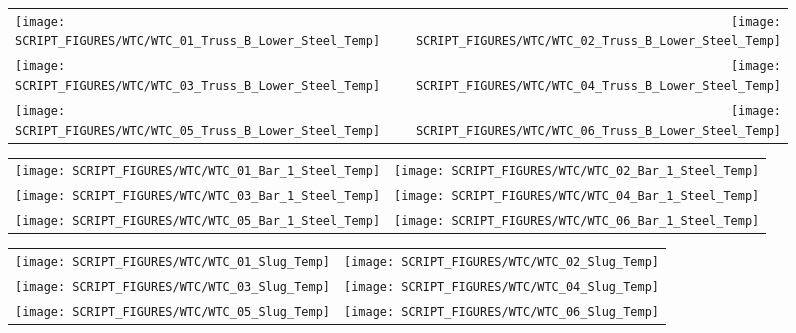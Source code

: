 \begin{figure}[p]
\begin{tabular*}{\textwidth}{l@{\extracolsep{\fill}}r}
\texttt{[image: SCRIPT\_FIGURES/WTC/WTC\_01\_Truss\_B\_Lower\_Steel\_Temp]} &
\texttt{[image: SCRIPT\_FIGURES/WTC/WTC\_02\_Truss\_B\_Lower\_Steel\_Temp]} \\
\texttt{[image: SCRIPT\_FIGURES/WTC/WTC\_03\_Truss\_B\_Lower\_Steel\_Temp]} &
\texttt{[image: SCRIPT\_FIGURES/WTC/WTC\_04\_Truss\_B\_Lower\_Steel\_Temp]} \\
\texttt{[image: SCRIPT\_FIGURES/WTC/WTC\_05\_Truss\_B\_Lower\_Steel\_Temp]} &
\texttt{[image: SCRIPT\_FIGURES/WTC/WTC\_06\_Truss\_B\_Lower\_Steel\_Temp]}
\end{tabular*}
\label{NIST_WTC_Truss_B_Lower_Steel_Temp}
\end{figure}


\begin{figure}[p]
\begin{tabular*}{\textwidth}{l@{\extracolsep{\fill}}r}
\texttt{[image: SCRIPT\_FIGURES/WTC/WTC\_01\_Bar\_1\_Steel\_Temp]} &
\texttt{[image: SCRIPT\_FIGURES/WTC/WTC\_02\_Bar\_1\_Steel\_Temp]} \\
\texttt{[image: SCRIPT\_FIGURES/WTC/WTC\_03\_Bar\_1\_Steel\_Temp]} &
\texttt{[image: SCRIPT\_FIGURES/WTC/WTC\_04\_Bar\_1\_Steel\_Temp]} \\
\texttt{[image: SCRIPT\_FIGURES/WTC/WTC\_05\_Bar\_1\_Steel\_Temp]} &
\texttt{[image: SCRIPT\_FIGURES/WTC/WTC\_06\_Bar\_1\_Steel\_Temp]}
\end{tabular*}
\label{NIST_WTC_Bar_1_Steel_Temp}
\end{figure}


\begin{figure}[p]
\begin{tabular*}{\textwidth}{l@{\extracolsep{\fill}}r}
\texttt{[image: SCRIPT\_FIGURES/WTC/WTC\_01\_Slug\_Temp]} &
\texttt{[image: SCRIPT\_FIGURES/WTC/WTC\_02\_Slug\_Temp]} \\
\texttt{[image: SCRIPT\_FIGURES/WTC/WTC\_03\_Slug\_Temp]} &
\texttt{[image: SCRIPT\_FIGURES/WTC/WTC\_04\_Slug\_Temp]} \\
\texttt{[image: SCRIPT\_FIGURES/WTC/WTC\_05\_Slug\_Temp]} &
\texttt{[image: SCRIPT\_FIGURES/WTC/WTC\_06\_Slug\_Temp]}
\end{tabular*}
\label{NIST_WTC_Slug_Temp}
\end{figure}

